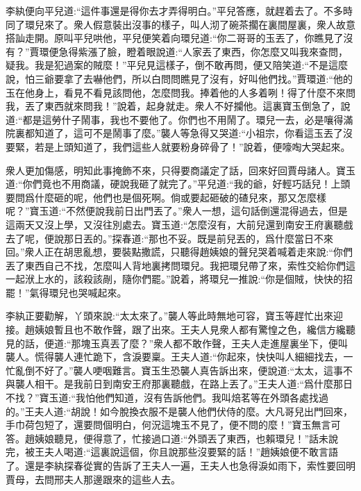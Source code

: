 \begin{parag}
    李紈便向平兒道:“這件事還是得你去才弄得明白。”平兒答應，就趕着去了。不多時同了環兒來了。衆人假意裝出沒事的樣子，叫人沏了碗茶擱在裏間屋裏，衆人故意搭訕走開。原叫平兒哄他，平兒便笑着向環兒道:“你二哥哥的玉丟了，你瞧見了沒有？”賈環便急得紫漲了臉，瞪着眼說道:“人家丟了東西，你怎麼又叫我來查問，疑我。我是犯過案的賊麼！”平兒見這樣子，倒不敢再問，便又陪笑道:“不是這麼說，怕三爺要拿了去嚇他們，所以白問問瞧見了沒有，好叫他們找。”賈環道:“他的玉在他身上，看見不看見該問他，怎麼問我。捧着他的人多着咧！得了什麼不來問我，丟了東西就來問我！”說着，起身就走。衆人不好攔他。這裏寶玉倒急了，說道:“都是這勞什子鬧事，我也不要他了。你們也不用鬧了。環兒一去，必是嚷得滿院裏都知道了，這可不是鬧事了麼。”襲人等急得又哭道:“小祖宗，你看這玉丟了沒要緊，若是上頭知道了，我們這些人就要粉身碎骨了！”說着，便嚎啕大哭起來。
\end{parag}


\begin{parag}
    衆人更加傷感，明知此事掩飾不來，只得要商議定了話，回來好回賈母諸人。寶玉道:“你們竟也不用商議，硬說我砸了就完了。”平兒道:“我的爺，好輕巧話兒！上頭要問爲什麼砸的呢，他們也是個死啊。倘或要起砸破的碴兒來，那又怎麼樣呢？”寶玉道:“不然便說我前日出門丟了。”衆人一想，這句話倒還混得過去，但是這兩天又沒上學，又沒往別處去。寶玉道:“怎麼沒有，大前兒還到南安王府裏聽戲去了呢，便說那日丟的。”探春道:“那也不妥。既是前兒丟的，爲什麼當日不來回。”衆人正在胡思亂想，要裝點撒謊，只聽得趙姨娘的聲兒哭着喊着走來說:“你們丟了東西自己不找，怎麼叫人背地裏拷問環兒。我把環兒帶了來，索性交給你們這一起洑上水的，該殺該剮，隨你們罷。”說着，將環兒一推說:“你是個賊，快快的招罷！”氣得環兒也哭喊起來。
\end{parag}


\begin{parag}
    李紈正要勸解，丫頭來說:“太太來了。”襲人等此時無地可容，寶玉等趕忙出來迎接。趙姨娘暫且也不敢作聲，跟了出來。王夫人見衆人都有驚惶之色，纔信方纔聽見的話，便道:“那塊玉真丟了麼？”衆人都不敢作聲，王夫人走進屋裏坐下，便叫襲人。慌得襲人連忙跪下，含淚要稟。王夫人道:“你起來，快快叫人細細找去，一忙亂倒不好了。”襲人哽咽難言。寶玉生恐襲人真告訴出來，便說道:“太太，這事不與襲人相干。是我前日到南安王府那裏聽戲，在路上丟了。”王夫人道:“爲什麼那日不找？”寶玉道:“我怕他們知道，沒有告訴他們。我叫焙茗等在外頭各處找過的。”王夫人道:“胡說！如今脫換衣服不是襲人他們伏侍的麼。大凡哥兒出門回來，手巾荷包短了，還要問個明白，何況這塊玉不見了，便不問的麼！”寶玉無言可答。趙姨娘聽見，便得意了，忙接過口道:“外頭丟了東西，也賴環兒！”話未說完，被王夫人喝道:“這裏說這個，你且說那些沒要緊的話！”趙姨娘便不敢言語了。還是李紈探春從實的告訴了王夫人一遍，王夫人也急得淚如雨下，索性要回明賈母，去問邢夫人那邊跟來的這些人去。
\end{parag}


